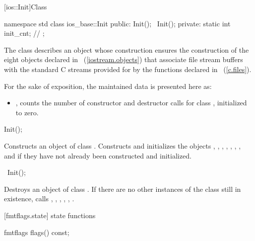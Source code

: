 [ios::Init]{Class }

%
\begin{codeblock}
namespace std {
  class ios_base::Init {
  public:
    Init();
   ~Init();
  private:
    static int init_cnt; // \exposr
  };
}
\end{codeblock}

\pnum
The class
describes an object whose construction
ensures the construction of the eight objects declared in
~(\ref{iostream.objects}) that associate file
stream buffers with the standard C streams
provided for by the functions declared in
~(\ref{c.files}).

\pnum
For the sake of exposition, the maintained data is presented here as:
\begin{itemize}
\item
{},
counts the number of
constructor and destructor calls for class
,
initialized to zero.
\end{itemize}

%
\begin{itemdecl}
Init();
\end{itemdecl}

\begin{itemdescr}
\pnum
\effects
Constructs an object of class
.
Constructs and initializes the objects , , ,
, , , , and  if
they have not already been constructed and initialized.
\end{itemdescr}

%
\begin{itemdecl}
~Init();
\end{itemdecl}

\begin{itemdescr}
\pnum
\effects
Destroys an object of class
.
If there are no other instances of the class still in existence,
calls
%
,
,
,
,
,
.
\end{itemdescr}

[fmtflags.state]{ state functions}

%
\begin{itemdecl}
fmtflags flags() const;
\end{itemdecl}


